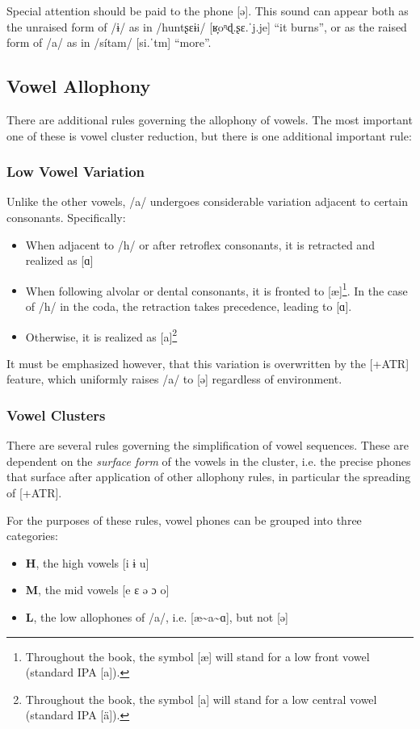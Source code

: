 \documentclass[paper=6in:9in, fontsize=10.5]{scrbook}
\newcommand{\en}[1]{``#1''}
\newcommand{\y}{ɨ}
\newcommand{\ý}{ɨ́}
\newcommand{\glem}[1]{\underline{\smash{#1}}}
\begin{document}
Special attention should be paid to the phone [ə]. This sound can appear both as the unraised form of /\y/ as in /huntʂɛ\y{}i/ [ʁ̞oᶯɖ.ʂɛ.ˈj\glem{ə}.je] \en{it burns}, or as the raised form of /a/ as in \mbox{/sítam/} [si.ˈt\glem{ə}m] \en{more}.


\subsection{Vowel Allophony}  
There are additional rules governing the allophony of vowels. The most important one of these is vowel cluster reduction, but there is one additional important rule:

\subsubsection{Low Vowel Variation} Unlike the other vowels, /a/ undergoes considerable variation adjacent to certain consonants. Specifically: 
\begin{itemize}
\item When adjacent to /h/ or after retroflex consonants, it is retracted and realized as [ɑ]
\item When following alvolar or dental consonants, it is fronted to [æ]\footnote{Throughout the book, the symbol [æ] will stand for a low front vowel (standard IPA [a]).}. In the case of /h/ in the coda, the retraction takes precedence, leading to [ɑ].
\item Otherwise, it is realized as [a]\footnote{Throughout the book, the symbol [a] will stand for a low central vowel (standard IPA [ä]).}
\end{itemize}

It must be emphasized however, that this variation is overwritten by the [+ATR] feature, which uniformly raises /a/ to [ə] regardless of environment.

\subsubsection{Vowel Clusters}\label{sssec:vowel_cluster}
There are several rules governing the simplification of vowel sequences. These are dependent on the \emph{surface form} of the vowels in the cluster, i.e. the precise phones that surface after application of other allophony rules, in particular the spreading of [+ATR]. 

For the purposes of these rules, vowel phones can be grouped into three categories: 
\begin{itemize}
\item \textbf{H}, the high vowels [i \y{} u]
\item \textbf{M}, the mid vowels [e ɛ ə ɔ o]
\item \textbf{L}, the low allophones of /a/, i.e. [æ\textasciitilde{}a\textasciitilde{}ɑ], but not [ə]
\end{itemize}
\end{document}
